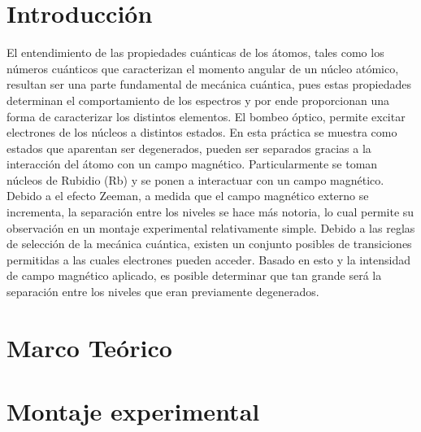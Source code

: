 \documentclass[%
 reprint,
 amsmath,amssymb,
 aps,
]{revtex4-1}
\begin{document}
\section{Introducción}
 El entendimiento de las propiedades cuánticas de los átomos, tales como los números cuánticos que caracterizan el momento angular de un núcleo atómico, resultan ser una parte fundamental de mecánica cuántica, pues estas propiedades determinan el comportamiento de los espectros y por ende proporcionan una forma de caracterizar los distintos elementos. El bombeo óptico, permite excitar electrones de los núcleos a distintos estados. En esta práctica se muestra como estados que aparentan ser degenerados, pueden ser separados gracias a la interacción del átomo con un campo magnético. Particularmente se toman núcleos de Rubidio (Rb) y se ponen a interactuar con un campo magnético. Debido a el efecto Zeeman, a medida que el campo magnético externo se incrementa, la separación entre los niveles se hace más notoria, lo cual permite su observación en un montaje experimental relativamente simple.
 Debido a las reglas de selección de la mecánica cuántica, existen un conjunto posibles de transiciones permitidas a las cuales electrones pueden acceder. Basado en esto y la intensidad de campo magnético aplicado, es posible determinar que tan grande será la separación entre los niveles que eran previamente degenerados.
 \section{Marco Teórico}
 
 
\section{Montaje experimental}
\end{document}
